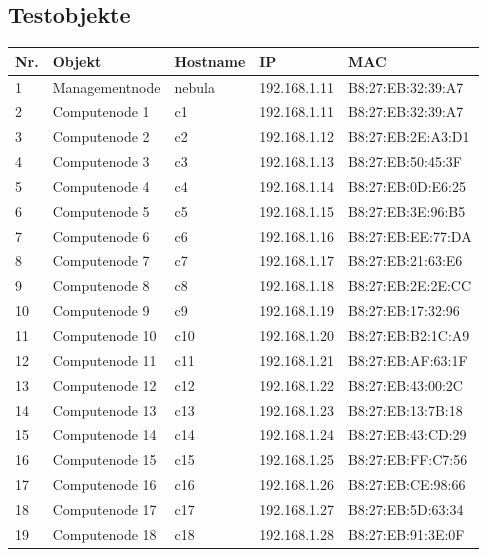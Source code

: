 
\subsection{Testobjekte}
\begin{table}[H]
\centering
\begin{tabular}{p{1cm}p{3cm}p{3cm}p{4cm}p{4cm}}
\hline
\rowcolor{heading} \textbf{Nr.} & \textbf{Objekt} & \textbf{Hostname} & \textbf{IP} & \textbf{MAC} \\\hline
1 & Managementnode & nebula & 192.168.1.11 & B8:27:EB:32:39:A7\\\hline
2 & Computenode 1 & c1 & 192.168.1.11 & B8:27:EB:32:39:A7\\\hline
3 & Computenode 2 & c2 & 192.168.1.12 & B8:27:EB:2E:A3:D1\\\hline
4 & Computenode 3 & c3 & 192.168.1.13 & B8:27:EB:50:45:3F\\\hline
5 & Computenode 4 & c4 & 192.168.1.14 & B8:27:EB:0D:E6:25\\\hline
6 & Computenode 5 & c5 & 192.168.1.15 & B8:27:EB:3E:96:B5\\\hline
7 & Computenode 6 & c6 & 192.168.1.16 & B8:27:EB:EE:77:DA\\\hline
8 & Computenode 7 & c7 & 192.168.1.17 & B8:27:EB:21:63:E6\\\hline
9 & Computenode 8 & c8 & 192.168.1.18 & B8:27:EB:2E:2E:CC\\\hline
10 & Computenode 9 & c9 & 192.168.1.19 & B8:27:EB:17:32:96\\\hline
11 & Computenode 10 & c10 & 192.168.1.20 & B8:27:EB:B2:1C:A9\\\hline
12 & Computenode 11 & c11 & 192.168.1.21 & B8:27:EB:AF:63:1F\\\hline
13 & Computenode 12 & c12 & 192.168.1.22 & B8:27:EB:43:00:2C\\\hline
14 & Computenode 13 & c13 & 192.168.1.23 & B8:27:EB:13:7B:18\\\hline
15 & Computenode 14 & c14 & 192.168.1.24 & B8:27:EB:43:CD:29\\\hline
16 & Computenode 15 & c15 & 192.168.1.25 & B8:27:EB:FF:C7:56\\\hline
17 & Computenode 16 & c16 & 192.168.1.26 & B8:27:EB:CE:98:66\\\hline
18 & Computenode 17 & c17 & 192.168.1.27 & B8:27:EB:5D:63:34\\\hline
19 & Computenode 18 & c18 & 192.168.1.28 & B8:27:EB:91:3E:0F\\\hline

\end{tabular}
\end{table}
